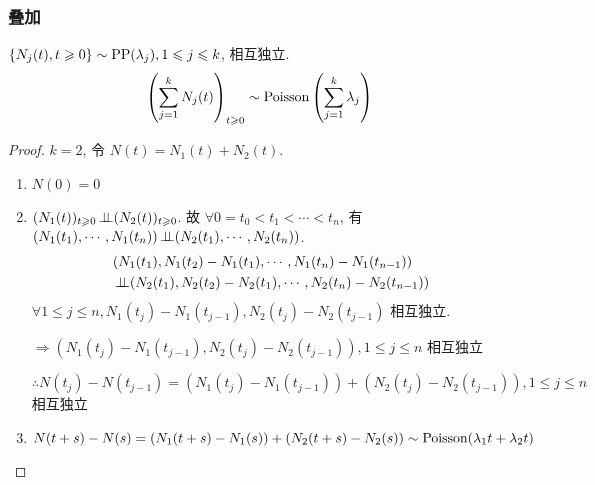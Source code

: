 \subsubsection{叠加}

\begin{theorem}
    $\{N_j(t),t\geqslant 0\}\sim \operatorname{PP}(\lambda_j), 1\leqslant j\leqslant k$, 相互独立.
    \begin{equation}
        \left(\sum_{j=1}^k N_j(t)\right)_{t\geqslant 0}\sim \operatorname{Poisson}\left(\sum_{j=1}^k\lambda_j\right)
    \end{equation}
\end{theorem}

\begin{proof}
    $k=2$, 令 $N(t)=N_1(t)+N_2(t)$.
    \begin{enumerate}
        \item $N(0)=0$
        \item $(N_1(t))_{t\geqslant 0}\operatorname{\perp\!\!\!\perp} (N_2(t))_{t\geqslant 0}$. 故 $\forall 0=t_0<t_1<\cdots<t_n$, 有 $(N_1(t_1),\cdots,N_1(t_n))\operatorname{\perp\!\!\!\perp} (N_2(t_1),\cdots,N_2(t_n))$.
        \[
        \begin{aligned}
            &(N_1(t_1),N_1(t_2)-N_1(t_1),\cdots,N_1(t_n)-N_1(t_{n-1}))\\
            &\operatorname{\perp\!\!\!\perp} (N_2(t_1),N_2(t_2)-N_2(t_1),\cdots,N_2(t_n)-N_2(t_{n-1}))
        \end{aligned}
        \]
        $\forall 1\leq j\leq n, N_1(t_j)-N_1(t_{j-1}),N_2(t_j)-N_2(t_{j-1})$ 相互独立.
        
        $\Rightarrow (N_1(t_j)-N_1(t_{j-1}), N_2(t_j)-N_2(t_{j-1})), 1\leq j\leq n$ 相互独立
        
        $\therefore N(t_j)-N(t_{j-1})=(N_1(t_j)-N_1(t_{j-1}))+(N_2(t_j)-N_2(t_{j-1})), 1\leq j\leq n$ 相互独立
        \item $N(t+s)-N(s)=(N_1(t+s)-N_1(s))+(N_2(t+s)-N_2(s))\sim \operatorname{Poisson}(\lambda_1 t+\lambda_2 t)$
    \end{enumerate}
\end{proof}


